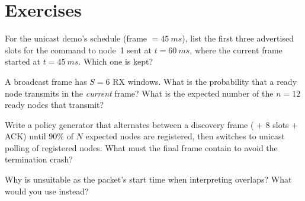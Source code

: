 \section*{Exercises}
\begin{exercise}
For the unicast demo's schedule (frame $=\SI{45}{ms}$), list the first three advertised slots for the command to node~1 sent at $t=\SI{60}{ms}$, where the current frame started at $t=\SI{45}{ms}$. Which one is kept?
\end{exercise}
\begin{exercise}
A broadcast frame has $S=6$ RX windows. What is the probability that a ready node transmits in the \emph{current} frame? What is the expected number of the $n=12$ ready nodes that transmit?
\end{exercise}
\begin{exercise}
Write a policy generator that alternates between a discovery frame ( + $8$ slots + ACK) until $90\%$ of $N$ expected nodes are registered, then switches to unicast polling of registered nodes. What must the final frame contain to avoid the termination crash?
\end{exercise}
\begin{exercise}
Why is  unsuitable as the packet's start time when interpreting overlaps? What would you use instead?
\end{exercise}
